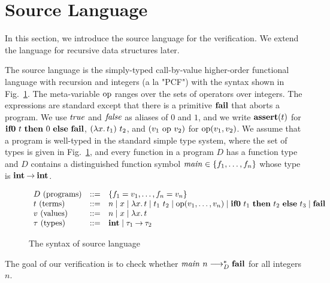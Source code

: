 \section{Source Language}
\label{sec:language}
In this section, we introduce the source language for the verification.
We extend the language for recursive data structures later.

The source language is the simply-typed call-by-value higher-order
functional language with recursion and integers (a la "PCF") with the
syntax shown in Fig.~\ref{fig:source-syntax}.
The meta-variable $\mathrm{op}$ ranges over the sets of operators over integers.
The expressions are standard except that there is a primitive $\mathbf{fail}$
that aborts a program.  We use $\mathit{true}$ and $\mathit{false}$ as aliases of $0$
and $1$, and we write $\mathbf{assert}({t})$ for $\mathbf{if0}~{t}~\mathbf{then}~{0}~\mathbf{else}~{\mathbf{fail}}$,
$(\lambda{x}.\,{t_1})\ t_2$, and $(v_1\ \mathrm{op}\ v_2)$ for $\mathrm{op}({v_1,v_2})$.  We
assume that a program is well-typed in the standard simple type system,
where the set of types is given in Fig.~\ref{fig:source-syntax}, and
every function in a program $D$ has a function type and $D$ contains a
distinguished function symbol $\mathit{main} \in \{{f_1,\dots,f_n}\}$ whose type
is ${\mathbf{int}}\mathbin{\rightarrow}{\mathbf{int}}$.

\begin{figure}[t]
\begin{minipage}{\widthcoef\textwidth}
\[
\begin{array}{lrl}
D\text{ (programs)} &::=& \{f_1 = v_1, \dots, f_n = v_n\} \\
t\text{ (terms)}
  &::=& n \mid x \mid \lambda{x}.\,{t} \mid t_1\ t_2 \mid \mathrm{op}({v_1,\dots,v_n}) \mid \mathbf{if0}~{t_1}~\mathbf{then}~{t_2}~\mathbf{else}~{t_3} \mid \mathbf{fail} \\
v\text{ (values)} &::=& n \mid x \mid \lambda{x}.\,{t} \\
\tau\text{ (types)} &::=& \mathbf{int} \mid {\tau_1}\mathbin{\rightarrow}{\tau_2} \\
\end{array}
\]
\end{minipage}
\caption{The syntax of source language}
\label{fig:source-syntax}
\end{figure}

The goal of our verification is to check whether ${\mathit{main}}~{n}
\longrightarrow^*_D \mathbf{fail}$ for all integers $n$.

